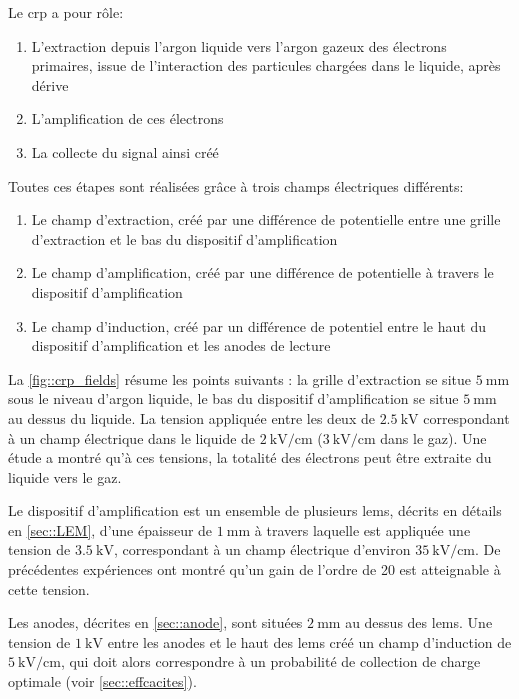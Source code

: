             Le \gls{crp} a pour rôle:
            \begin{enumerate}
                \item L'extraction depuis l'argon liquide vers l'argon gazeux des électrons primaires, issue de l'interaction des particules chargées dans le liquide, après dérive
                \item L'amplification de ces électrons
                \item La collecte du signal ainsi créé
            \end{enumerate}
            Toutes ces étapes sont réalisées grâce à trois champs électriques différents:
            \begin{enumerate}
                \item Le champ d'extraction, créé par une différence de potentielle entre une grille d'extraction et le bas du dispositif d'amplification
                \item Le champ d'amplification, créé par une différence de potentielle à travers le dispositif d'amplification
                \item Le champ d'induction, créé par un différence de potentiel entre le haut du dispositif d'amplification et les anodes de lecture
            \end{enumerate}
            La \autoref{fig::crp_fields} résume les points suivants : la grille d'extraction se situe $\SI{5}{\milli\meter}$ sous le niveau d'argon liquide, le bas du dispositif d'amplification se situe $\SI{5}{\milli\meter}$ au dessus du liquide. La tension appliquée entre les deux de $\SI{2.5}{\kilo\volt}$ correspondant à un champ électrique dans le liquide de $\SI{2}{\kilo\volt\per\centi\meter}$ ($\SI{3}{\kilo\volt\per\centi\meter}$ dans le gaz). Une étude \cite{guschin} a montré qu'à ces tensions, la totalité des électrons peut être extraite du liquide vers le gaz.
            
            Le dispositif d'amplification est un ensemble de plusieurs \glspl{lem}, décrits en détails en \autoref{sec::LEM}, d'une épaisseur de $\SI{1}{\milli\meter}$ à travers laquelle est appliquée une tension de $\SI{3.5}{\kilo\volt}$, correspondant à un champ électrique d'environ $\SI{35}{\kilo\volt\per\centi\meter}$. De précédentes expériences \cite{Badertscher2011,Cantini2014} ont montré qu'un gain de l'ordre de 20 est atteignable à cette tension.
            
            Les anodes, décrites en \autoref{sec::anode}, sont situées $\SI{2}{\milli\meter}$ au dessus des \glspl{lem}. Une tension de $\SI{1}{\kilo\volt}$ entre les anodes et le haut des \glspl{lem} créé un champ d'induction de $\SI{5}{\kilo\volt\per\centi\meter}$, qui doit alors correspondre à un probabilité de collection de charge optimale (voir \autoref{sec::effcacites}).
            
